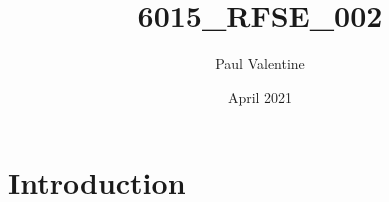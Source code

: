 \documentclass{article}
\title{6015_RFSE_002}
\author{Paul Valentine}
\date{April 2021}
\begin{document}
\maketitle

\section{Introduction}
\end{document}
